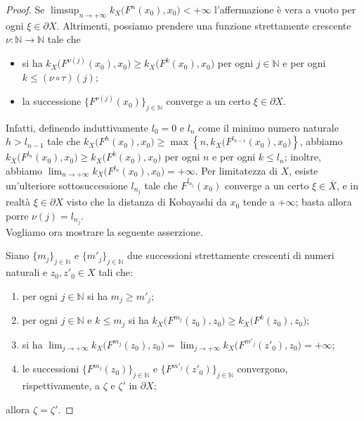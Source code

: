 \begin{proof}
    Se $\displaystyle\limsup_{n\longrightarrow+\infty}k_X\big(F^n(x_0),x_0\big)<+\infty$ l'affermazione è vera a vuoto per ogni $\xi\in\partial X$. Altrimenti, possiamo prendere una funzione strettamente crescente $\nu:\mathbb{N}\longrightarrow\mathbb{N}$ tale che
    \begin{itemize}
        \item si ha $k_X\big(F^{\nu(j)}(x_0),x_0\big) \ge k_X\big(F^k(x_0),x_0\big)$ per ogni $j \in \mathbb{N}$ e per ogni $k \le (\nu\circ\tau)(j)$;
        \item la successione $\{F^{\nu(j)}(x_0)\}_{j\in\mathbb{N}}$ converge a un certo $\xi\in\partial X$.
    \end{itemize}
    
    Infatti, definendo induttivamente $l_0=0$ e $l_n$ come il minimo numero naturale $h>l_{n-1}$ tale che $k_X\big(F^h(x_0),x_0\big) \ge \max\left\{n,k_X\big(F^{l_{n-1}}(x_0),x_0\big)\right\}$, abbiamo $k_X\big(F^{l_n}(x_0),x_0\big) \ge k_X\big(F^k(x_0),x_0\big)$ per ogni $n$ e per ogni $k \le l_n$; inoltre, abbiamo $\displaystyle\lim_{n\longrightarrow+\infty}k_X\big(F^{l_n}(x_0),x_0\big)=+\infty$. Per limitatezza di $X$, esiste un'ulteriore sottosuccessione $l_{n_j}$ tale che $F^{l_{n_j}}(x_0)$ converge a un certo $\xi\in\overline{X}$, e in realtà $\xi\in\partial X$ visto che la distanza di Kobayashi da $x_0$ tende a $+\infty$; basta allora porre $\nu(j)=l_{n_j}$.\\

    Vogliamo ora mostrare la seguente asserzione.

    Siano $\{m_j\}_{j\in\mathbb{N}}$ e $\{m'_j\}_{j\in\mathbb{N}}$ due successioni strettamente crescenti di numeri naturali e $z_0,z'_0\in X$ tali che:
    \begin{enumerate}[label={(\arabic*)}]
        \item per ogni $j\in\mathbb{N}$ si ha $m_j \ge m'_j$;
        \item per ogni $j\in\mathbb{N}$ e $k \le m_j$ si ha $k_X\big(F^{m_j}(z_0),z_0\big) \ge k_X\big(F^k(z_0),z_0\big)$;
        \item si ha $\displaystyle\lim_{j\longrightarrow+\infty}k_X\big(F^{m_j}(z_0),z_0\big)=\lim_{j\longrightarrow+\infty}k_X\big(F^{m'_j}(z'_0),z_0\big)=+\infty$;
        \item le successioni $\{F^{m_j}(z_0)\}_{j\in\mathbb{N}}$ e $\{F^{m'_j}(z'_0)\}_{j\in\mathbb{N}}$ convergono, rispettivamente, a $\zeta$ e $\zeta'$ in $\partial X$;
    \end{enumerate}
    allora $\zeta=\zeta'$.


\end{proof}
